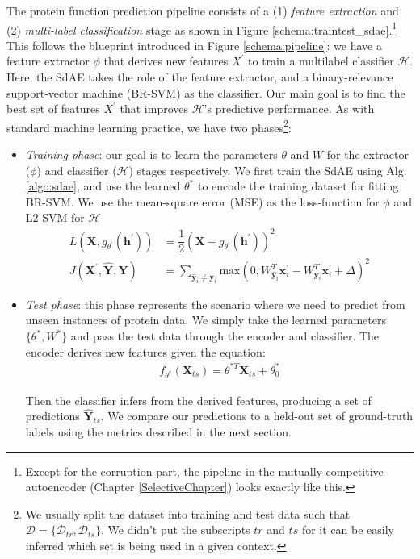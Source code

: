 \par The protein function prediction pipeline consists of a (1) \textit{feature
extraction} and (2) \textit{multi-label classification} stage as shown in
Figure \ref{schema:traintest_sdae}.\footnote{
    Except for the corruption part, the pipeline in the mutually-competitive
    autoencoder (Chapter \ref{SelectiveChapter}) looks exactly like this.
} 
This follows the blueprint introduced in Figure \ref{schema:pipeline}: we have
a feature extractor $\phi$ that derives new features $X^{\prime}$ to train a
multilabel classifier $\mathcal{H}$. Here, the SdAE takes the role of the
feature extractor, and a binary-relevance support-vector machine (BR-SVM) as
the classifier. Our main goal is to find the best set of features $X^{\prime}$
that improves $\mathcal{H}$'s predictive performance. As with standard machine
learning practice, we have two phases\footnote{
  We usually split the dataset into training and test data such that
  $\mathcal{D} = \{\mathcal{D}_{tr}, \mathcal{D}_{ts}\}$. We didn't put the
  subscripts $tr$ and $ts$ for it can be easily inferred which set is being
  used in a given context.
}:

\begin{itemize}
  \item \textit{Training phase}: our goal is to learn the parameters $\theta$
  and $W$ for the extractor ($\phi$) and classifier ($\mathcal{H}$) stages
  respectively. We first train the SdAE using Alg. \ref{algo:sdae}, and use
  the learned $\theta^{\ast}$ to encode the training dataset for fitting
  BR-SVM. We use the mean-square error (MSE) as the loss-function for $\phi$ and
  L2-SVM for $\mathcal{H}$
  \begin{align}
    \label{eqn:loss_fe_sdae}
    L(\mathbf{X},g_{\theta^{\prime}}(\mathbf{h}^{\prime})) &=
      \dfrac{1}{2}(\mathbf{X} - g_{\theta^{\prime}}(\mathbf{h}^{\prime}))^{2}\\
    \label{eqn:loss_clf_sdae}
    J(\mathbf{X}^{\prime}, \widehat{\mathbf{Y}}, \mathbf{Y}) &= \sum_{\widehat{\mathbf{y}}_i \neq \mathbf{y}_{i}} \text{max}(0, W^{T}_{\widehat{\mathbf{y}}_{i}} \mathbf{x}_{i}^{\prime} - W^{T}_{\mathbf{y}_i}\mathbf{x}^{\prime}_i + \Delta)^2
  \end{align}
  \item \textit{Test phase}: this phase represents the scenario where we need
  to predict from unseen instances of protein data. We simply take the
  learned parameters $\{\theta^{\ast}, W^{\ast}\}$ and pass the test data
  through the encoder and classifier. The encoder derives new features given the
  equation: 
  \begin{align}
    \label{eqn:encoder_mc_sdae}
    f_{\theta^{\ast}}(\mathbf{X}_{ts}) = \theta^{\ast T} \mathbf{X}_{ts} + \theta_{0}^{\ast}
  \end{align}
 
  \noindent Then the classifier infers from the derived features, producing a set of
  predictions $\mathbf{\widehat{Y}}_{ts}$. We compare our predictions to a
  held-out set of ground-truth labels using the metrics described in the next
  section.
\end{itemize}

